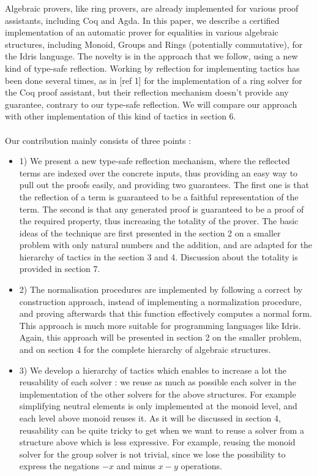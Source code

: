 Algebraic provers, like ring provers, are already implemented for various proof assistants, including Coq and Agda. In this paper, we describe a certified implementation of an automatic prover for equalities in various algebraic structures, including Monoid, Groups and Rings (potentially commutative), for the Idris language. The novelty is in the approach that we follow, using a new kind of type-safe reflection.
Working by reflection for implementing tactics has been done several times, as in [ref 1] for the implementation of a ring solver for the Coq proof assistant, but their reflection mechanism  doesn't provide any guarantee, contrary to our type-safe reflection. We will compare our approach with other implementation of this kind of tactics in section 6. \\
\\
Our contribution mainly consists of three points :
\begin{itemize}
	\item 1) We present a new type-safe reflection mechanism, where the reflected terms are indexed over the concrete inputs, thus providing an easy way to pull out the proofs easily, and providing two guarantees. The first one is that the reflection of a term is guaranteed to be a faithful representation of the term. The second is that any generated proof is guaranteed to be a proof of the required property, thus increasing the totality of the prover. The basic ideas of the technique are first presented in the section 2 on a smaller problem with only natural numbers and the addition, and are adapted for the hierarchy of tactics in the section 3 and 4. Discussion about the totality is provided in section 7.	
	\item 2) The normalisation procedures are implemented by following a correct by construction approach, instead of implementing a normalization procedure, and proving afterwards that this function effectively computes a normal form. This approach is much more suitable for programming languages like Idris. Again, this approach will be presented in section 2 on the smaller problem, and on section 4 for the complete hierarchy of algebraic structures.
	\item 3) We develop a hierarchy of tactics which enables to increase a lot the reusability of each solver : we reuse as much as possible each solver in the implementation of the other solvers for the above structures. For example simplifying neutral elements is only implemented at the monoid level, and each level above monoid reuses it. As it will be discussed in section 4, reusability can be quite tricky to get when we want to reuse a solver from a structure above which is less expressive. For example, reusing the monoid solver for the group solver is not trivial, since we lose the possibility to express the negations $-x$ and minus $x-y$ operations.
\end{itemize}